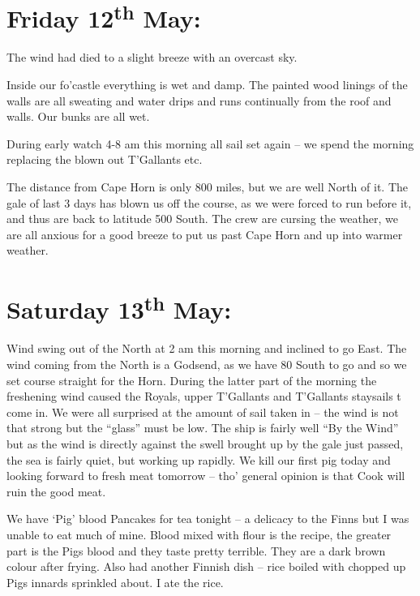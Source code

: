 \documentclass[
  11pt,
  msmallroyalvopaper
]{memoir}
\begin{document}
\hypertarget{friday-12th-may}{%
\section{\texorpdfstring{Friday 12\textsuperscript{th}
May:}{Friday 12th May:}}\label{friday-12th-may}}

The wind had died to a slight breeze with an overcast sky.

Inside our fo'castle everything is wet and damp. The painted wood
linings of the walls are all sweating and water drips and runs
continually from the roof and walls. Our bunks are all wet.

During early watch 4-8 am this morning all sail set again -- we spend
the morning replacing the blown out T'Gallants etc.

The distance from Cape Horn is only 800 miles, but we are well North of
it. The gale of last 3 days has blown us off the course, as we were
forced to run before it, and thus are back to latitude 500 South. The
crew are cursing the weather, we are all anxious for a good breeze to
put us past Cape Horn and up into warmer weather.

\hypertarget{saturday-13th-may}{%
\section{\texorpdfstring{Saturday 13\textsuperscript{th}
May:}{Saturday 13th May:}}\label{saturday-13th-may}}

Wind swing out of the North at 2 am this morning and inclined to go
East. The wind coming from the North is a Godsend, as we have 80 South
to go and so we set course straight for the Horn. During the latter part
of the morning the freshening wind caused the Royals, upper T'Gallants
and T'Gallants staysails t come in. We were all surprised at the amount
of sail taken in -- the wind is not that strong but the ``glass'' must
be low. The ship is fairly well ``By the Wind'' but as the wind is
directly against the swell brought up by the gale just passed, the sea
is fairly quiet, but working up rapidly. We kill our first pig today and
looking forward to fresh meat tomorrow -- tho' general opinion is that
Cook will ruin the good meat.

We have `Pig' blood Pancakes for tea tonight -- a delicacy to the Finns
but I was unable to eat much of mine. Blood mixed with flour is the
recipe, the greater part is the Pigs blood and they taste pretty
terrible. They are a dark brown colour after frying. Also had another
Finnish dish -- rice boiled with chopped up Pigs innards sprinkled
about. I ate the rice.
\end{document}
